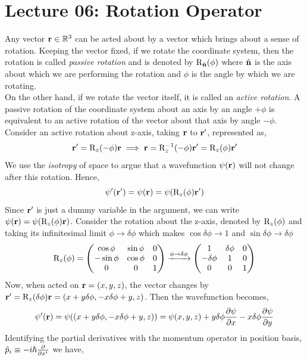 \section*{Lecture 06: Rotation Operator}
Any vector $\vb{r}\in \mathbb{R}^3$ can be acted about by a vector which brings about a sense of rotation. Keeping the vector fixed, if we rotate the coordinate system, then the rotation is called \textit{passive rotation} and is denoted by $\mathrm{R}_{\hat{\vb{n}}}\qty(\phi)$ where $\hat{\vb{n}}$ is the axis about which we are performing the rotation and $\phi$ is the angle by which we are rotating.\\[0.2cm] On the other hand, if we rotate the vector itself, it is called an \textit{active rotation}. A passive rotation of the coordinate system about an axis by an angle $+\phi$ is equivalent to an active rotation of the vector about that axis by angle $-\phi$.\\[0.2cm]
Consider an active rotation about z-axis, taking $\vb{r}$ to $\vb{r}'$, represented as,
$$\vb{r}' = \mathrm{R}_{z}\qty(-\phi) \vb{r} \implies \vb{r} = \mathrm{R}_{z}^{-1}\qty(-\phi)\vb{r}' = \mathrm{R}_{z}\qty(\phi)\vb{r}'$$
We use the \textit{isotropy} of space to argue that a wavefunction $\psi(\vb{r})$ will not change after this rotation. Hence,
$$\psi'(\vb{r}') = \psi(\vb{r}) = \psi(\mathrm{R}_{z}\qty(\phi)\vb{r}')$$
Since $\vb{r}'$ is just a dummy variable in the argument, we can write $\psi(\vb{r}) = \psi(\mathrm{R}_{z}\qty(\phi)\vb{r})$. Consider the rotation about the z-axis, denoted by $\mathrm{R}_{z}\qty(\phi)$ and taking its infinitesimal limit $\phi\to \delta \phi$ which makes $\cos\delta\phi \to 1$ and $\sin\delta \phi\to \delta \phi$
\begin{align*}
    \rn{z}{\phi} = \mqty(\cos\phi & \sin\phi & 0\\ -\sin\phi & \cos\phi & 0 \\ 0 & 0 & 1)\xrightarrow{\phi\to \delta \phi}\mqty(1 & \delta\phi & 0\\ -\delta\phi & 1 & 0 \\ 0 & 0 & 1)
\end{align*}
Now, when acted on $\vb{r} = (x,y,z)$, the vector changes by $\vb{r}' = \mathrm{R}_{z}\qty(\delta\phi)\vb{r} =(x+y\delta \phi, -x\delta \phi + y, z)$. Then the wavefunction becomes,
\begin{align*}
    \psi'(\vb{r}) = \psi((x+y\delta \phi, -x\delta \phi + y, z)) =\psi(x,y,z) +y\delta\phi \pdv{\psi}{x}-x\delta\phi\pdv{\psi}{y}
\end{align*}
Identifying the partial derivatives with the momentum operator in position basis, $\hat{p}_i \equiv -i\hbar \pdv{x^i}$ we have,
